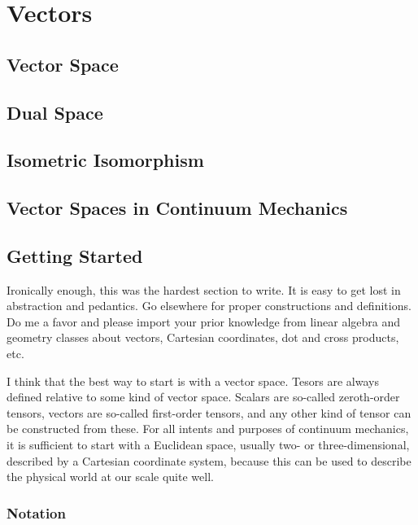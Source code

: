 \chapter{Vectors}
\label{chapter:Vectors}


\section{Vector Space}

\section{Dual Space}

\section{Isometric Isomorphism}

\section{Vector Spaces in Continuum Mechanics}

\section{Getting Started}

Ironically enough, this was the hardest section to write. It is easy to get lost in abstraction and pedantics. Go elsewhere for proper constructions and definitions. Do me a favor and please import your prior knowledge from linear algebra and geometry classes about vectors, Cartesian coordinates, dot and cross products, etc.

I think that the best way to start is with a vector space. Tesors are always defined relative to some kind of vector space. Scalars are so-called zeroth-order tensors, vectors are so-called first-order tensors, and any other kind of tensor can be constructed from these. For all intents and purposes of continuum mechanics, it is sufficient to start with a Euclidean space, usually two- or three-dimensional, described by a Cartesian coordinate system, because this can be used to describe the physical world at our scale quite well.

\subsection{Notation}

